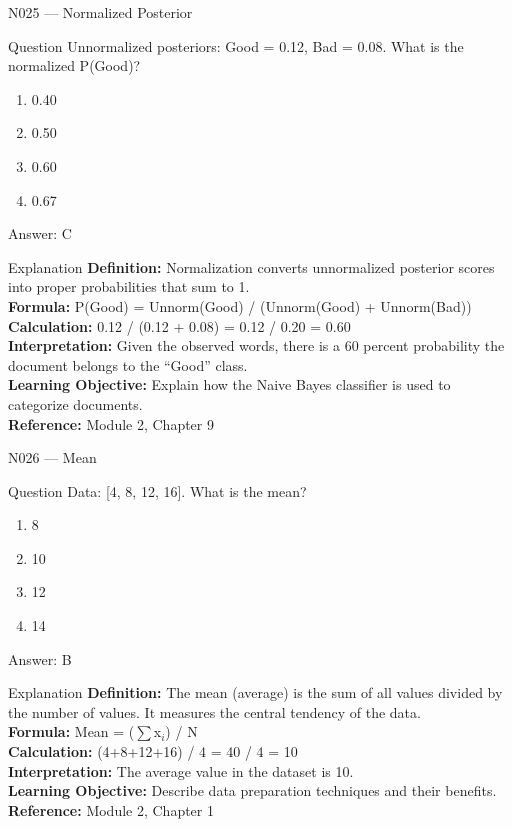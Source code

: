 \documentclass[aspectratio=169,8pt]{beamer}
\begin{document}
	\begin{frame}{N025 --- Normalized Posterior}
		\begin{block}{Question}
			Unnormalized posteriors: Good = 0.12, Bad = 0.08. What is the normalized P(Good)?
			\begin{enumerate}
				\item 0.40
				\item 0.50
				\item 0.60
				\item 0.67
			\end{enumerate}
		\end{block}
		\begin{exampleblock}{Answer: C}\end{exampleblock}
		\begin{block}{Explanation}
			\textbf{Definition:} Normalization converts unnormalized posterior scores into proper probabilities that sum to 1.\\
			\textbf{Formula:} P(Good) = Unnorm(Good) / (Unnorm(Good) + Unnorm(Bad))\\
			\textbf{Calculation:} 0.12 / (0.12 + 0.08) = 0.12 / 0.20 = 0.60\\
			\textbf{Interpretation:} Given the observed words, there is a 60 percent probability the document belongs to the ``Good'' class.\\
			\textbf{Learning Objective:} Explain how the Naive Bayes classifier is used to categorize documents.\\
			\textbf{Reference:} Module 2, Chapter 9
		\end{block}
	\end{frame}
	
	\begin{frame}{N026 --- Mean}
		\begin{block}{Question}
			Data: [4, 8, 12, 16]. What is the mean?
			\begin{enumerate}
				\item 8
				\item 10
				\item 12
				\item 14
			\end{enumerate}
		\end{block}
		\begin{exampleblock}{Answer: B}\end{exampleblock}
		\begin{block}{Explanation}
			\textbf{Definition:} The mean (average) is the sum of all values divided by the number of values. It measures the central tendency of the data.\\
			\textbf{Formula:} Mean = ($\sum$x$_{i}$) / N\\
			\textbf{Calculation:} (4+8+12+16) / 4 = 40 / 4 = 10\\
			\textbf{Interpretation:} The average value in the dataset is 10.\\
			\textbf{Learning Objective:} Describe data preparation techniques and their benefits.\\
			\textbf{Reference:} Module 2, Chapter 1
		\end{block}
	\end{frame}
	
\end{document}
